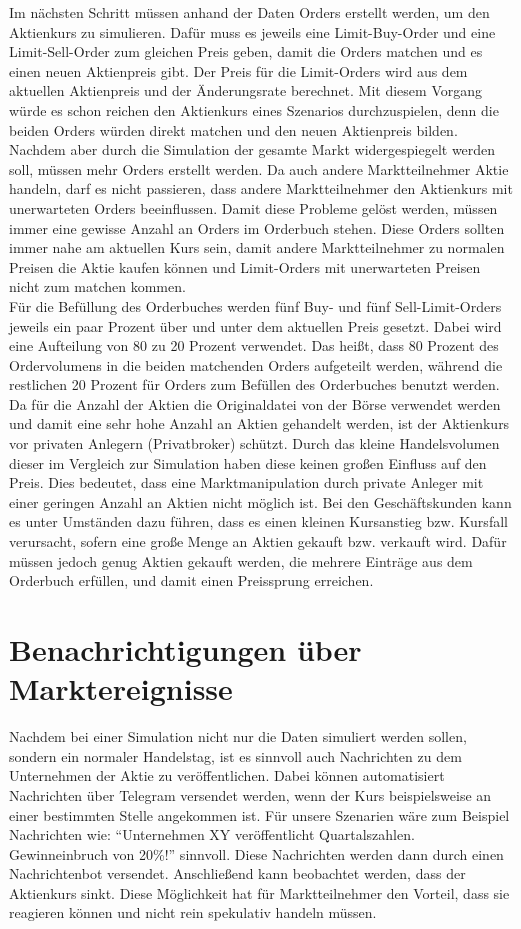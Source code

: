 Im nächsten Schritt müssen anhand der Daten Orders erstellt werden, um den Aktienkurs zu simulieren. Dafür muss es jeweils eine Limit-Buy-Order 
und eine Limit-Sell-Order zum gleichen Preis geben, damit die Orders matchen und es einen neuen Aktienpreis gibt. Der Preis für die 
Limit-Orders wird aus dem aktuellen Aktienpreis und der Änderungsrate berechnet.
Mit diesem Vorgang würde es schon reichen den Aktienkurs eines Szenarios durchzuspielen, denn die beiden Orders würden direkt matchen und den neuen Aktienpreis bilden.
Nachdem aber durch die Simulation der gesamte Markt widergespiegelt werden soll, müssen mehr Orders erstellt werden.
Da auch andere Marktteilnehmer Aktie handeln, darf es nicht passieren, dass andere Marktteilnehmer 
den Aktienkurs mit unerwarteten Orders beeinflussen. Damit diese Probleme gelöst werden, müssen immer eine gewisse Anzahl an Orders 
im Orderbuch stehen. Diese Orders sollten immer nahe am aktuellen Kurs sein, damit andere Marktteilnehmer zu normalen Preisen die 
Aktie kaufen können und Limit-Orders mit unerwarteten Preisen nicht zum matchen kommen. \\
Für die Befüllung des Orderbuches werden fünf Buy- und fünf Sell-Limit-Orders jeweils ein paar Prozent über und unter dem aktuellen 
Preis gesetzt. Dabei wird eine Aufteilung von 80 zu 20 Prozent verwendet.
Das heißt, dass 80 Prozent des Ordervolumens in die beiden matchenden Orders aufgeteilt werden, während die restlichen 20 Prozent für Orders zum Befüllen des Orderbuches benutzt werden.\\
Da für die Anzahl der Aktien die Originaldatei von der Börse verwendet werden und damit eine sehr hohe Anzahl an Aktien gehandelt werden, ist der Aktienkurs vor 
privaten Anlegern (Privatbroker) schützt.
Durch das kleine Handelsvolumen dieser im Vergleich zur Simulation haben diese keinen großen Einfluss auf den Preis. Dies bedeutet, dass eine Marktmanipulation durch private Anleger mit 
einer geringen Anzahl an Aktien nicht möglich ist. Bei den Geschäftskunden kann es unter Umständen dazu führen, dass es einen kleinen Kursanstieg bzw. Kursfall 
verursacht, sofern eine große Menge an Aktien gekauft bzw. verkauft wird.
Dafür müssen jedoch genug Aktien gekauft werden, die mehrere Einträge aus dem Orderbuch 
erfüllen, und damit einen Preissprung erreichen.


\section{Benachrichtigungen über Marktereignisse}
Nachdem bei einer Simulation nicht nur die Daten simuliert werden sollen, sondern ein normaler Handelstag, ist es sinnvoll auch Nachrichten 
zu dem Unternehmen der Aktie zu veröffentlichen. Dabei können automatisiert Nachrichten über Telegram versendet werden, wenn der Kurs beispielsweise 
an einer bestimmten Stelle angekommen ist. Für unsere Szenarien wäre zum Beispiel Nachrichten wie: \enquote{Unternehmen XY veröffentlicht Quartalszahlen. 
Gewinneinbruch von 20\%!} sinnvoll. Diese Nachrichten werden dann durch einen Nachrichtenbot versendet.
Anschließend kann beobachtet werden, dass der Aktienkurs sinkt. Diese Möglichkeit hat für Marktteilnehmer den Vorteil, dass sie reagieren können und nicht 
rein spekulativ handeln müssen.
